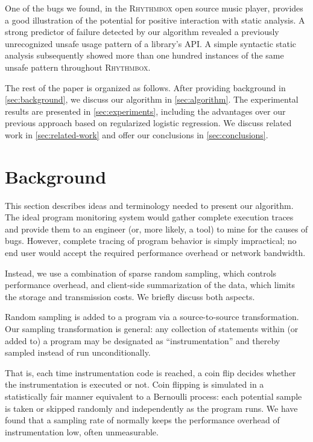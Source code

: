 \documentclass[draft]{sig-alternate}
\newcommand{\rhythmbox}{\textsc{Rhythmbox}\xspace}
\begin{document}
One of the bugs we found, in the \rhythmbox open source music player,
provides a good illustration of the potential for positive interaction
with static analysis.  A strong predictor of failure detected by our
algorithm revealed a previously unrecognized unsafe usage pattern of a
library's API\@.  A simple syntactic static analysis subsequently showed
more than one hundred instances of the same unsafe pattern throughout
\rhythmbox.

The rest of the paper is organized as follows.  After providing background
in \autoref{sec:background}, we discuss our algorithm
in \autoref{sec:algorithm}. The experimental results are presented in
\autoref{sec:experiments}, including the advantages over our
previous approach based on regularized logistic regression.
We discuss related work in \autoref{sec:related-work} and offer our conclusions
in \autoref{sec:conclusions}.


\section{Background}
\label{sec:background}

This section describes ideas and terminology needed to present our
algorithm.  The ideal program monitoring system would gather complete
execution traces and provide them to an engineer (or, more likely, a
tool) to mine for the causes of bugs.  However, complete tracing of
program behavior is simply impractical; no end user would accept the
required performance overhead or network bandwidth.

Instead, we use a combination of sparse random sampling, which controls
performance overhead, and client-side summarization of the data, which
limits the storage and transmission costs.  We briefly discuss
both aspects.

Random sampling is added to a program via a source-to-source transformation.
Our sampling transformation is general: any collection of
statements within (or added to) a program may be designated as
``instrumentation'' and thereby sampled instead of run
unconditionally.

That is, each time instrumentation code is reached,
a coin flip decides whether the instrumentation is executed or not.
Coin flipping is simulated in a statistically fair
manner equivalent to a Bernoulli process: each potential sample is
taken or skipped randomly and independently as the program runs.
We have found that a sampling rate of  normally keeps the performance overhead
of instrumentation low, often unmeasurable.
\end{document}
